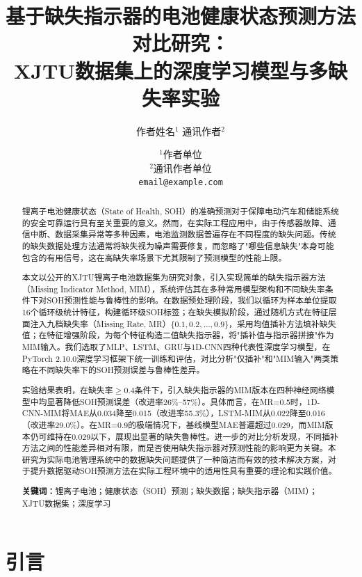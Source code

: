 \documentclass[10pt,a4paper]{ctexart}
\title{\textbf{基于缺失指示器的电池健康状态预测方法对比研究：\\XJTU数据集上的深度学习模型与多缺失率实验}}
\author{作者姓名$^{1}$ \quad 通讯作者$^{2}$}
\date{$^{1}$作者单位 \\ $^{2}$通讯作者单位 \\ \texttt{email@example.com}}
\begin{document}
\maketitle

\begin{abstract}
锂离子电池健康状态（State of Health, SOH）的准确预测对于保障电动汽车和储能系统的安全可靠运行具有至关重要的意义。然而，在实际工程应用中，由于传感器故障、通信中断、数据采集异常等多种因素，电池监测数据普遍存在不同程度的缺失问题。传统的缺失数据处理方法通常将缺失视为噪声需要修复，而忽略了"哪些信息缺失"本身可能包含的有用信号，这在高缺失率场景下尤其限制了预测模型的性能上限。

本文以公开的XJTU锂离子电池数据集为研究对象，引入实现简单的缺失指示器方法（Missing Indicator Method, MIM），系统评估其在多种常用模型架构和不同缺失率条件下对SOH预测性能与鲁棒性的影响。在数据预处理阶段，我们以循环为样本单位提取16个循环级统计特征，构建循环级SOH标签；在缺失模拟阶段，通过随机方式在特征层面注入九档缺失率（Missing Rate, MR）$\{0.1, 0.2, \ldots, 0.9\}$，采用均值插补方法填补缺失值；在特征增强阶段，为每个特征构造二值缺失指示器，将"插补值与指示器拼接"作为MIM输入。我们选取了MLP、LSTM、GRU与1D-CNN四种代表性深度学习模型，在PyTorch 2.10.0深度学习框架下统一训练和评估，对比分析"仅插补"和"MIM输入"两类策略在不同缺失率下的SOH预测误差与鲁棒性差异。

实验结果表明，在缺失率$\geq 0.4$条件下，引入缺失指示器的MIM版本在四种神经网络模型中均显著降低SOH预测误差（改进率26\%--57\%）。具体而言，在MR=0.5时，1D-CNN-MIM将MAE从0.034降至0.015（改进率55.3\%），LSTM-MIM从0.022降至0.016（改进率29.0\%）。在MR=0.9的极端情况下，基线模型MAE普遍超过0.029，而MIM版本仍可维持在0.029以下，展现出显著的缺失鲁棒性。进一步的对比分析发现，不同插补方法之间的性能差异相对有限，而是否使用缺失指示器对预测性能的影响更为关键。本研究为实际电池管理系统中的数据缺失问题提供了一种简洁而有效的技术解决方案，对于提升数据驱动SOH预测方法在实际工程环境中的适用性具有重要的理论和实践价值。

\textbf{关键词：}锂离子电池；健康状态（SOH）预测；缺失数据；缺失指示器（MIM）；XJTU数据集；深度学习
\end{abstract}

\section{引言}\label{sec:intro}
\end{document}

